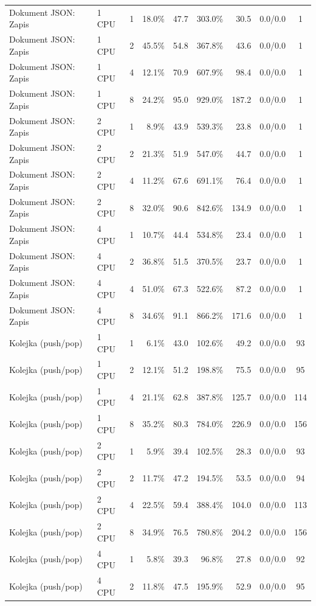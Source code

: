 \begin{table}[ht]
{\begin{tabular}{llcrrrrcc}
Dokument JSON: Zapis & 1 CPU & 1 & 18.0\% & 47.7 & 303.0\% & 30.5 & 0.0/0.0 & 1 \\
Dokument JSON: Zapis & 1 CPU & 2 & 45.5\% & 54.8 & 367.8\% & 43.6 & 0.0/0.0 & 1 \\
Dokument JSON: Zapis & 1 CPU & 4 & 12.1\% & 70.9 & 607.9\% & 98.4 & 0.0/0.0 & 1 \\
Dokument JSON: Zapis & 1 CPU & 8 & 24.2\% & 95.0 & 929.0\% & 187.2 & 0.0/0.0 & 1 \\
Dokument JSON: Zapis & 2 CPU & 1 & 8.9\% & 43.9 & 539.3\% & 23.8 & 0.0/0.0 & 1 \\
Dokument JSON: Zapis & 2 CPU & 2 & 21.3\% & 51.9 & 547.0\% & 44.7 & 0.0/0.0 & 1 \\
Dokument JSON: Zapis & 2 CPU & 4 & 11.2\% & 67.6 & 691.1\% & 76.4 & 0.0/0.0 & 1 \\
Dokument JSON: Zapis & 2 CPU & 8 & 32.0\% & 90.6 & 842.6\% & 134.9 & 0.0/0.0 & 1 \\
Dokument JSON: Zapis & 4 CPU & 1 & 10.7\% & 44.4 & 534.8\% & 23.4 & 0.0/0.0 & 1 \\
Dokument JSON: Zapis & 4 CPU & 2 & 36.8\% & 51.5 & 370.5\% & 23.7 & 0.0/0.0 & 1 \\
Dokument JSON: Zapis & 4 CPU & 4 & 51.0\% & 67.3 & 522.6\% & 87.2 & 0.0/0.0 & 1 \\
Dokument JSON: Zapis & 4 CPU & 8 & 34.6\% & 91.1 & 866.2\% & 171.6 & 0.0/0.0 & 1 \\
Kolejka (push/pop) & 1 CPU & 1 & 6.1\% & 43.0 & 102.6\% & 49.2 & 0.0/0.0 & 93 \\
Kolejka (push/pop) & 1 CPU & 2 & 12.1\% & 51.2 & 198.8\% & 75.5 & 0.0/0.0 & 95 \\
Kolejka (push/pop) & 1 CPU & 4 & 21.1\% & 62.8 & 387.8\% & 125.7 & 0.0/0.0 & 114 \\
Kolejka (push/pop) & 1 CPU & 8 & 35.2\% & 80.3 & 784.0\% & 226.9 & 0.0/0.0 & 156 \\
Kolejka (push/pop) & 2 CPU & 1 & 5.9\% & 39.4 & 102.5\% & 28.3 & 0.0/0.0 & 93 \\
Kolejka (push/pop) & 2 CPU & 2 & 11.7\% & 47.2 & 194.5\% & 53.5 & 0.0/0.0 & 94 \\
Kolejka (push/pop) & 2 CPU & 4 & 22.5\% & 59.4 & 388.4\% & 104.0 & 0.0/0.0 & 113 \\
Kolejka (push/pop) & 2 CPU & 8 & 34.9\% & 76.5 & 780.8\% & 204.2 & 0.0/0.0 & 156 \\
Kolejka (push/pop) & 4 CPU & 1 & 5.8\% & 39.3 & 96.8\% & 27.8 & 0.0/0.0 & 92 \\
Kolejka (push/pop) & 4 CPU & 2 & 11.8\% & 47.5 & 195.9\% & 52.9 & 0.0/0.0 & 95 \\

\end{tabular}}
\end{table}
